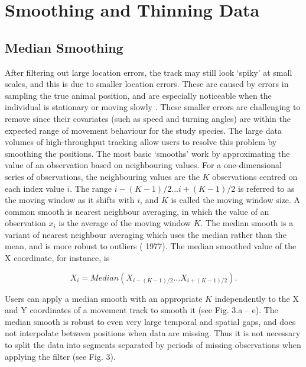 \documentclass[10pt,paper=a4,headings=standardclasses
]{scrartcl}
\begin{document}
\section{Smoothing and Thinning Data}

\subsection{Median Smoothing}

After filtering out large location errors, the track may still look ‘spiky’ at small scales, and this is due to smaller location errors.
These are caused by errors in sampling the true animal position, and are especially noticeable when the individual is stationary or moving slowly \citep{noonan2019}.
These smaller errors are challenging to remove since their covariates (such as speed and turning angles) are within the expected range of movement behaviour for the study species. 
The large data volumes of high-throughput tracking allow users to resolve this problem by smoothing the positions. 
The most basic ‘smooths’ work by approximating the value of an observation based on neighbouring values.
For a one-dimensional series of observations, the neighbouring values are the $K$ observations centred on each index value $i$.
The range $ {i - (K-1)/2} \ldots {i + (K-1)/2} $ is referred to as the moving window as it shifts with $i$, and $K$ is called the moving window size.
A common smooth is nearest neighbour averaging, in which the value of an observation $x_i$ is the average of the moving window $K$.
The median smooth is a variant of nearest neighbour averaging which uses the median rather than the mean, and is more robust to outliers (\citeauthor{tukey1977} 1977).
The median smoothed value of the X coordinate, for instance, is
%
\begin{linenomath*}
    \begin{equation*}
        X_i = Median(X_{i - (K-1)/2} \ldots X_{i + (K-1)/2}).
     \end{equation*}
\end{linenomath*}
%
Users can apply a median smooth with an appropriate $K$ independently to the X and Y coordinates of a movement track to smooth it (see Fig. 3.a -- e).
The median smooth is robust to even very large temporal and spatial gaps, and does not interpolate between positions when data are missing. 
Thus it is not necessary to split the data into segments separated by periods of missing observations when applying the filter (see Fig. 3).
\end{document}
